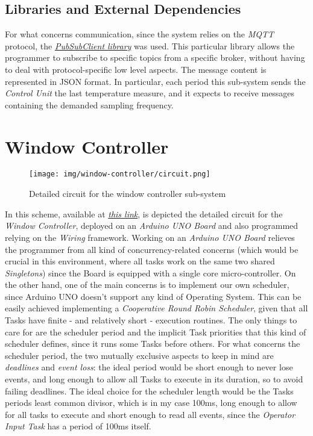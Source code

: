 \documentclass[a4paper,12pt]{report}
\begin{document}
	\subsection{Libraries and External Dependencies}
	For what concerns communication, since the system relies on the \textit{MQTT} protocol, the \href{https://pubsubclient.knolleary.net/}{\textit{PubSubClient library}} was used. This particular library allows the programmer to subscribe to specific topics from a specific broker, without having to deal with protocol-specific low level aspects. The message content is represented in JSON format. In particular, each period this sub-system sends the \textit{Control Unit} the last temperature measure, and it expects to receive messages containing the demanded sampling frequency.
	\section{Window Controller}
	\begin{figure}[H]
		\centering{}
		\texttt{[image: img/window-controller/circuit.png]}
		\caption{Detailed circuit for the window controller sub-system}
		\label{img:window-controller/circuit}
	\end{figure}
	In this scheme, available at \href{https://www.tinkercad.com/things/2nadVXk0wQ5-esiot-assignment-03-arduino?sharecode=t4LayAw_Rc1SNLqdSHt3uK_EuT6TttEPHQjHAwEp-Zc}{\textit{this link}}, is depicted the detailed circuit for the \textit{Window Controller}, deployed on an \textit{Arduino UNO Board} and also programmed relying on the \textit{Wiring} framework.
	\newline Working on an \textit{Arduino UNO Board} relieves the programmer from all kind of concurrency-related concerns (which would be crucial in this environment, where all tasks work on the same two shared \textit{Singletons}) since the Board is equipped with a single core micro-controller.
	\newline On the other hand, one of the main concerns is to implement our own scheduler, since Arduino UNO doesn't support any kind of Operating System. This can be easily achieved implementing a \textit{Cooperative Round Robin Scheduler}, given that all Tasks have finite - and relatively short - execution routines. The only things to care for are the scheduler period and the implicit Task priorities that this kind of scheduler defines, since it runs some Tasks before others.
	\newline For what concerns the scheduler period, the two mutually exclusive aspects to keep in mind are \textit{deadlines} and \textit{event loss}: the ideal period would be short enough to never lose events, and long enough to allow all Tasks to execute in its duration, so to avoid failing deadlines. The ideal choice for the scheduler length would be the Tasks periods least common divisor, which is in my case 100ms, long enough to allow for all tasks to execute and short enough to read all events, since the \textit{Operator Input Task} has a period of 100ms itself.
\end{document}
